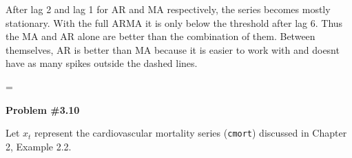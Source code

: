\documentclass[12pt]{article}
\makeatletter
\newcommand*\notab[1]{%
  \begingroup   %
    \par        %
    \@totalleftmargin=0pt \linewidth=\columnwidth
    \parshape 0
    #1\par      %
  \endgroup
}
\newcommand{\nl}{\vspace{0.1in}\noindent}
\makeatother
\begin{document}
\nl After lag 2 and lag 1 for AR and MA respectively, the series becomes mostly stationary. With the full ARMA it is only below the threshold after lag 6. Thus the MA and AR alone are better than the combination of them. Between themselves, AR is better than MA because it is easier to work with and doesnt have as many spikes outside the dashed lines.

\notab{}


\vspace{.3in}
\noindent \textbf{Problem \#3.10}

\noindent Let $x_t$ represent the cardiovascular mortality series (\texttt{cmort}) discussed in
Chapter 2, Example 2.2.
\end{document}
